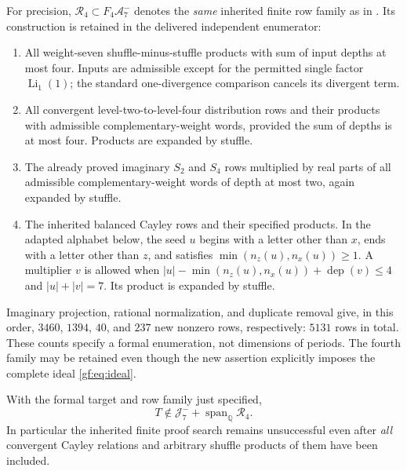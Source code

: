 For precision, $\mathscr R_4\subset F_4\mathcal A_7^-$ denotes the
\emph{same} inherited finite row family as in \cite{gf:Bounded}. Its
construction is retained in the delivered independent enumerator:
\begin{enumerate}
\item All weight-seven shuffle-minus-stuffle products with sum of input
      depths at most four. Inputs are admissible except for the permitted
      single factor $\operatorname{Li}_1(1)$; the standard one-divergence
      comparison cancels its divergent term.
\item All convergent level-two-to-level-four distribution rows and their
      products with admissible complementary-weight words, provided the
      sum of depths is at most four. Products are expanded by stuffle.
\item The already proved imaginary $S_2$ and $S_4$ rows multiplied by real
      parts of all admissible complementary-weight words of depth at most
      two, again expanded by stuffle.
\item The inherited balanced Cayley rows and their specified products.
      In the adapted alphabet below, the seed $u$ begins with a letter
      other than $x$, ends with a letter other than $z$, and satisfies
      $\min(n_z(u),n_x(u))\geq1$. A multiplier $v$ is allowed when
      $|u|-\min(n_z(u),n_x(u))+\operatorname{dep}(v)\leq4$ and
      $|u|+|v|=7$. Its product is expanded by stuffle.
\end{enumerate}
Imaginary projection, rational normalization, and duplicate removal give,
in this order, $3460$, $1394$, $40$, and $237$ new nonzero rows, respectively:
$5131$ rows in total. These counts specify a formal enumeration, not
dimensions of periods. The fourth family may be retained even though the
new assertion explicitly imposes the complete ideal \eqref{gf:eq:ideal}.

\begin{theorem}
\label{gf:thm:main}
With the formal target and row family just specified,
\begin{equation}
 \boxed{\qquad
 T\notin\mathcal J_7^-+\operatorname{span}_{\mathbb Q}\mathscr R_4.
 \qquad}
 \label{gf:eq:nonmembership}
\end{equation}
In particular the inherited finite proof search remains unsuccessful even
after \emph{all} convergent Cayley relations and arbitrary shuffle products
of them have been included.
\end{theorem}

